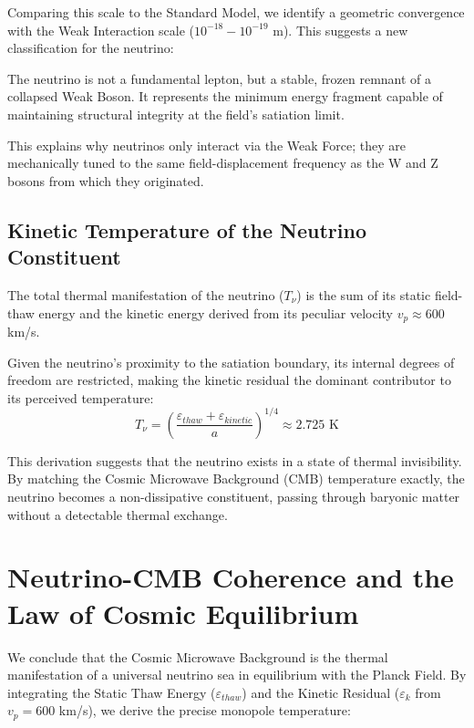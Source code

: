 Comparing this scale to the Standard Model, we identify a geometric convergence with the Weak Interaction scale ($10^{-18} - 10^{-19}$ m). This suggests a new classification for the neutrino:

\begin{tcolorbox}[title=Neutrino Origin Hypothesis]
The neutrino is not a fundamental lepton, but a stable, frozen remnant of a collapsed Weak Boson. It represents the minimum energy fragment capable of maintaining structural integrity at the field's satiation limit.
\end{tcolorbox}

This explains why neutrinos only interact via the Weak Force; they are mechanically tuned to the same field-displacement frequency as the W and Z bosons from which they originated.

\subsection{Kinetic Temperature of the Neutrino Constituent}
The total thermal manifestation of the neutrino ($T_{\nu}$) is the sum of its static field-thaw energy and the kinetic energy derived from its peculiar velocity $v_p \approx 600$ km/s. 

Given the neutrino's proximity to the satiation boundary, its internal degrees of freedom are restricted, making the kinetic residual the dominant contributor to its perceived temperature:
\begin{equation}
T_{\nu} = \left( \frac{\varepsilon_{thaw} + \varepsilon_{kinetic}}{a} \right)^{1/4} \approx 2.725 \text{ K}
\end{equation}

This derivation suggests that the neutrino exists in a state of thermal invisibility. By matching the Cosmic Microwave Background (CMB) temperature exactly, the neutrino becomes a non-dissipative constituent, passing through baryonic matter without a detectable thermal exchange.

\section{Neutrino-CMB Coherence and the Law of Cosmic Equilibrium}
We conclude that the Cosmic Microwave Background is the thermal manifestation of a universal neutrino sea in equilibrium with the Planck Field. By integrating the Static Thaw Energy ($\varepsilon_{thaw}$) and the Kinetic Residual ($\varepsilon_k$ from $v_p = 600$ km/s), we derive the precise monopole temperature:

